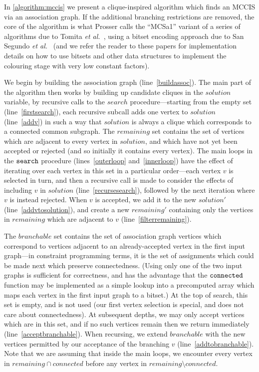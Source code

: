 \documentclass{llncs}
\newcommand{\lineref}[1]{line~\ref{#1}}
\newcommand{\twolinesref}[2]{lines~\ref{#1} and~\ref{#2}}
\begin{document}
In \cref{algorithm:mccis} we present a clique-inspired algorithm which finds an MCCIS via an
association graph. If the additional
branching restrictions are removed, the core of the algorithm is what Prosser
\cite{DBLP:journals/algorithms/Prosser12} calls the ``MCSa1'' variant of a series of algorithms due
to Tomita \textit{et al.}\
\cite{DBLP:conf/dmtcs/TomitaS03,DBLP:journals/jgo/TomitaK07,DBLP:conf/walcom/TomitaSHTW10}, using a
bitset encoding approach due to San Segundo \textit{et al.}\
\cite{DBLP:journals/cor/SegundoRJ11,DBLP:journals/ol/SegundoMRH13} (and we refer the reader to these
papers for implementation details on how to use bitsets and other data structures to implement the
colouring stage with very low constant factors).

We begin by building the association graph (\lineref{buildassoc}). The main part of the algorithm
then works by building up candidate cliques in the $\mathit{solution}$ variable, by recursive calls
to the $\mathit{search}$ procedure---starting from the empty set (\lineref{firstsearch}), each
recursive subcall adds one vertex to $\mathit{solution}$ (\lineref{addv}) in such a way that
$\mathit{solution}$ is always a clique which corresponds to a connected common subgraph. The
$\mathit{remaining}$ set contains the set of vertices which are adjacent to every vertex in
$\mathit{solution}$, and which have not yet been accepted or rejected (and so initially it contains
every vertex). The main loops in the $\FuncSty{search}$ procedure
(\twolinesref{outerloop}{innerloop}) have the effect of iterating over each vertex in this set in a
particular order---each vertex $v$ is selected in turn, and then a recursive call is made to
consider the effects of including $v$ in $\mathit{solution}$ (\lineref{recursesearch}), followed by
the next iteration where $v$ is instead rejected. When $v$ is accepted, we add it to the new
$\mathit{solution'}$ (\lineref{addvtosolution}), and create a new $\mathit{remaining'}$ containing
only the vertices in $\mathit{remaining}$ which are adjacent to $v$ (\lineref{filterremaining}).

The $\mathit{branchable}$ set contains the set of association graph vertices which correspond to
vertices adjacent to an already-accepted vertex in the first input graph---in constraint programming terms, it is the
set of assignments which could be made next which preserve connectedness. (Using only one of the two
input graphs is sufficient for correctness, and has the advantage that the $\FuncSty{connected}$
function may be implemented as a simple lookup into a precomputed array which maps each vertex in
the first input graph to a bitset.) At the top of search, this set is empty, and is not used (our
first vertex selection is special, and does not care about connectedness). At subsequent depths, we
may only accept vertices which are in this set, and if no such vertices remain then we return
immediately (\lineref{acceptbranchable}). When recursing, we extend $\mathit{branchable}$ with the
new vertices permitted by our acceptance of the branching $v$ (\lineref{addtobranchable}). Note that
we are assuming that inside the main loops, we encounter every vertex in $\mathit{remaining} \cap
\mathit{connected}$ before any vertex in $\mathit{remaining} \setminus \mathit{connected}$.
\end{document}
